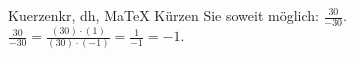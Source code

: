 \begin{MAufgabe}{Kuerzen}{kr, dh, MaTeX}
K\"urzen Sie soweit m\"oglich: $\frac{30}{-30}$.\\ 
\ifLsg\MLoesung
\quad $\frac{30}{-30}=\frac{(30)\cdot(1)}{(30)\cdot(-1)}=\frac{1}{-1}=-1$.\else\relax\fi
 \end{MAufgabe}
